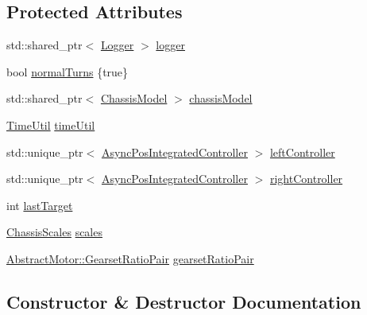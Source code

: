 \subsection*{Protected Attributes}
\begin{DoxyCompactItemize}
\item 
std\+::shared\+\_\+ptr$<$ \mbox{\hyperlink{classokapi_1_1Logger}{Logger}} $>$ \mbox{\hyperlink{classokapi_1_1ChassisControllerIntegrated_a9427d1704071c9a2c3b2cf188acb3dd6}{logger}}
\item 
bool \mbox{\hyperlink{classokapi_1_1ChassisControllerIntegrated_a76f6d35c280f998a9d8af013e9131f90}{normal\+Turns}} \{true\}
\item 
std\+::shared\+\_\+ptr$<$ \mbox{\hyperlink{classokapi_1_1ChassisModel}{Chassis\+Model}} $>$ \mbox{\hyperlink{classokapi_1_1ChassisControllerIntegrated_a1bd4b6be267db5c317f4600c37044abb}{chassis\+Model}}
\item 
\mbox{\hyperlink{classokapi_1_1TimeUtil}{Time\+Util}} \mbox{\hyperlink{classokapi_1_1ChassisControllerIntegrated_addd982f5928a19f17105409a96eaf419}{time\+Util}}
\item 
std\+::unique\+\_\+ptr$<$ \mbox{\hyperlink{classokapi_1_1AsyncPosIntegratedController}{Async\+Pos\+Integrated\+Controller}} $>$ \mbox{\hyperlink{classokapi_1_1ChassisControllerIntegrated_a88fed580a2c24de00def9d00eee941bf}{left\+Controller}}
\item 
std\+::unique\+\_\+ptr$<$ \mbox{\hyperlink{classokapi_1_1AsyncPosIntegratedController}{Async\+Pos\+Integrated\+Controller}} $>$ \mbox{\hyperlink{classokapi_1_1ChassisControllerIntegrated_a830da9ca0c53fcf7d85f37f48489be90}{right\+Controller}}
\item 
int \mbox{\hyperlink{classokapi_1_1ChassisControllerIntegrated_a8da00973b2828f04a19572b246ba2ec5}{last\+Target}}
\item 
\mbox{\hyperlink{classokapi_1_1ChassisScales}{Chassis\+Scales}} \mbox{\hyperlink{classokapi_1_1ChassisControllerIntegrated_af833eeaa8569585c7f44280261c46521}{scales}}
\item 
\mbox{\hyperlink{structokapi_1_1AbstractMotor_1_1GearsetRatioPair}{Abstract\+Motor\+::\+Gearset\+Ratio\+Pair}} \mbox{\hyperlink{classokapi_1_1ChassisControllerIntegrated_a24178f28a3d581242235e5150618b148}{gearset\+Ratio\+Pair}}
\end{DoxyCompactItemize}


\subsection{Constructor \& Destructor Documentation}
\mbox{\label{classokapi_1_1ChassisControllerIntegrated_ab78c2cf4add65a424b6bf31c9030f7b2}} 
